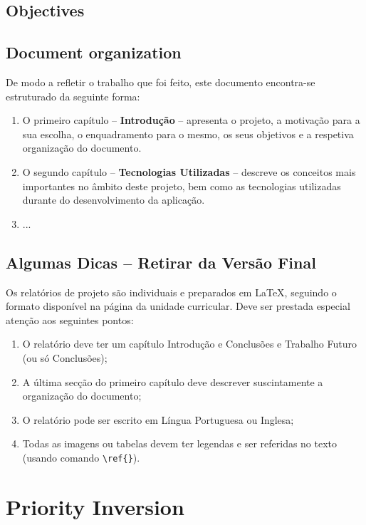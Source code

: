 \documentclass[titlepage,12pt,a4paper,times]{book}
\begin{document}
\section{Objectives}
\label{sec:obj}

\section{Document organization}
\label{sec:organ}
De modo a refletir o trabalho que foi feito, este documento encontra-se
estruturado da seguinte forma:
\begin{enumerate}
\item O primeiro capítulo -- \textbf{Introdução} -- apresenta o projeto, a
	motivação para a sua escolha, o enquadramento para o mesmo, os seus
	objetivos e a respetiva organização do documento.
\item O segundo capítulo -- \textbf{Tecnologias Utilizadas} -- descreve os
	conceitos mais importantes no âmbito deste projeto, bem como as tecnologias
	utilizadas durante do desenvolvimento da aplicação.
\item ...
\end{enumerate}

%
\section{Algumas Dicas -- Retirar da Versão Final}
Os relatórios de projeto são individuais e preparados em \LaTeX, seguindo o
formato disponível na página da unidade curricular. Deve ser prestada especial
atenção aos seguintes pontos:
\begin{enumerate}
  \item O relatório deve ter um capítulo Introdução e Conclusões e Trabalho
	  Futuro (ou só Conclusões);
  \item A última secção do primeiro capítulo deve descrever suscintamente a
	  organização do documento;
  \item O relatório pode ser escrito em Língua Portuguesa ou Inglesa;
  \item Todas as imagens ou tabelas devem ter legendas e ser referidas no texto
	  (usando comando \texttt{\textbackslash ref\{\}}).
\end{enumerate}

\chapter{Priority Inversion}
\label{chap:pi}
\end{document}

